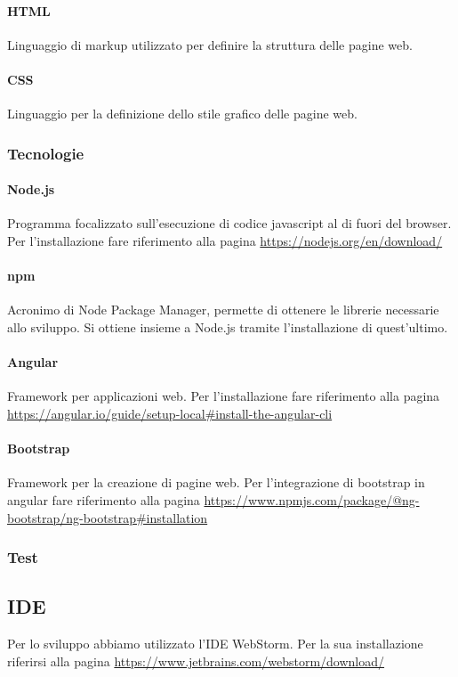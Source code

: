 \paragraph{HTML}
Linguaggio di markup utilizzato per definire la struttura delle pagine web.

\paragraph{CSS}
Linguaggio per la definizione dello stile grafico delle pagine web.

\subsubsection{Tecnologie}
\paragraph{Node.js}
Programma focalizzato sull'esecuzione di codice javascript al di fuori del browser.
Per l'installazione fare riferimento alla pagina \url{https://nodejs.org/en/download/} 
\paragraph{npm}
Acronimo di Node Package Manager, permette di ottenere le librerie necessarie allo sviluppo.
Si ottiene insieme a Node.js tramite l'installazione di quest'ultimo.
\paragraph{Angular}
Framework per applicazioni web.
Per l'installazione fare riferimento alla pagina \url{https://angular.io/guide/setup-local#install-the-angular-cli}
\paragraph{Bootstrap}
Framework per la creazione di pagine web.
Per l'integrazione di bootstrap in angular fare riferimento alla pagina \url{https://www.npmjs.com/package/@ng-bootstrap/ng-bootstrap#installation}

\subsubsection{Test}

\subsection{IDE}
Per lo sviluppo abbiamo utilizzato l'IDE WebStorm. Per la sua installazione riferirsi alla pagina \url{https://www.jetbrains.com/webstorm/download/}

